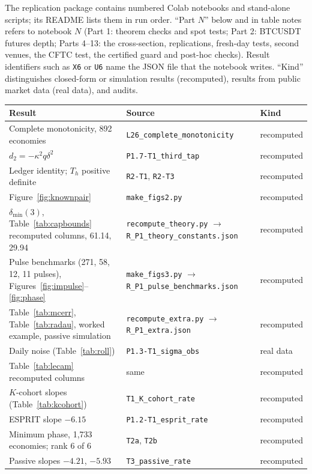 The replication package contains numbered Colab notebooks and stand-alone scripts; its README lists them in run order. ``Part $N$'' below and in table notes refers to notebook $N$ (Part 1: theorem checks and spot tests; Part 2: BTCUSDT futures depth; Parts 4--13: the cross-section, replications, fresh-day tests, second venues, the CFTC test, the certified guard and post-hoc checks). Result identifiers such as \texttt{X6} or \texttt{U6} name the JSON file that the notebook writes. ``Kind'' distinguishes closed-form or simulation results (recomputed), results from public market data (real data), and audits.

\begin{longtable}{p{}p{}p{}}
\toprule
Result & Source & Kind\\
\midrule
\endhead
Complete monotonicity, 892 economies & \nolinkurl{L26_complete_monotonicity} & recomputed\\
$d_2=-\kappa^2q\delta^2$ & \nolinkurl{P1.7-T1_third_tap} & recomputed\\
Ledger identity; $T_h$ positive definite & \nolinkurl{R2-T1}, \nolinkurl{R2-T3} & recomputed\\
Figure~\ref{fig:knownpair} & \nolinkurl{make_figs2.py} & recomputed\\
$\delta_{\min}(3)$, Table~\ref{tab:capbounds} recomputed columns, 61.14, 29.94 & \nolinkurl{recompute_theory.py} $\to$ \nolinkurl{R_P1_theory_constants.json} & recomputed\\
Pulse benchmarks (271, 58, 12, 11 pulses), Figures~\ref{fig:impulse}--\ref{fig:phase} & \nolinkurl{make_figs3.py} $\to$ \nolinkurl{R_P1_pulse_benchmarks.json} & recomputed\\
Table~\ref{tab:mcerr}, Table~\ref{tab:radau}, worked example, passive simulation & \nolinkurl{recompute_extra.py} $\to$ \nolinkurl{R_P1_extra.json} & recomputed\\
Daily noise (Table~\ref{tab:roll}) & \nolinkurl{P1.3-T1_sigma_obs} & real data\\
Table~\ref{tab:lecam} recomputed columns & same & recomputed\\
$K$-cohort slopes (Table~\ref{tab:kcohort}) & \nolinkurl{T1_K_cohort_rate} & recomputed\\
ESPRIT slope $-6.15$ & \nolinkurl{P1.2-T1_esprit_rate} & recomputed\\
Minimum phase, 1,733 economies; rank 6 of 6 & \nolinkurl{T2a}, \nolinkurl{T2b} & recomputed\\
Passive slopes $-4.21$, $-5.93$ & \nolinkurl{T3_passive_rate} & recomputed\\

\end{longtable}
